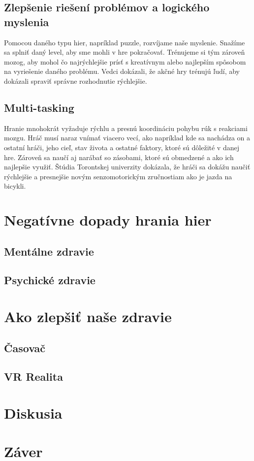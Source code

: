 \documentclass[10pt,twoside,slovak,a4paper]{article}
\begin{document}
\subsection{Zlepšenie riešení problémov a logického myslenia}
Pomocou daného typu hier, napríklad puzzle, rozvíjame naše myslenie. Snažíme sa splniť daný level, aby sme mohli v hre pokračovať. Trénujeme si tým zároveň mozog, aby mohol čo najrýchlejšie prísť s kreatívnym alebo najlepším spôsobom na vyriešenie daného problému. Vedci dokázali, že akčné hry trénujú ľudí, aby dokázali spraviť správne rozhodnutie rýchlejšie. \cite{decision}


\subsection{Multi-tasking}
Hranie mnohokrát vyžaduje rýchlu a presnú koordináciu pohybu rúk s reakciami mozgu. Hráč musí naraz vnímať viacero vecí, ako napríklad kde sa nachádza on a ostatní hráči, jeho cieľ, stav života a ostatné faktory, ktoré sú dôležité v danej hre. Zároveň sa naučí aj narábať so zásobami, ktoré sú obmedzené a ako ich najlepšie využiť. Štúdia Torontskej univerzity dokázala, že hráči sa dokážu naučiť rýchlejšie a presnejšie novým senzomotorickým zručnostiam ako je jazda na bicykli. \cite{sensorimotor}


\section{Negatívne dopady hrania hier}

\subsection{Mentálne zdravie}

\subsection{Psychické zdravie}



\section{Ako zlepšiť naše zdravie}

\subsection{Časovač}

\subsection{VR Realita}


\section{Diskusia}


\section{Záver}






\end{document}
